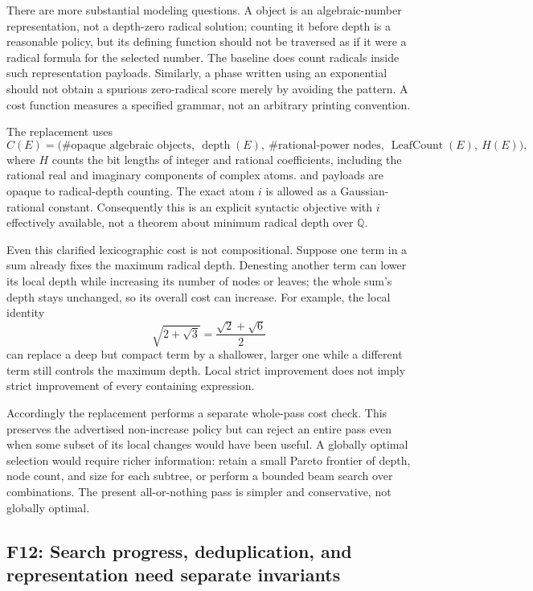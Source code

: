 \documentclass[11pt,letterpaper]{article}
\newcommand{\code}[1]{\texttt{\detokenize{#1}}}
\newcommand{\Q}{\mathbb{Q}}
\DeclareMathOperator{\depth}{depth}
\theoremstyle{definition}
\theoremstyle{remark}
\newcommand{\finding}[2]{\subsection{#1: #2}\label{f:#1}}
\begin{document}
There are more substantial modeling questions. A \code{Root} object is an algebraic-number representation, not a depth-zero radical solution; counting it before depth is a reasonable policy, but its defining function should not be traversed as if it were a radical formula for the selected number. The baseline does count radicals inside such representation payloads. Similarly, a phase written using an exponential should not obtain a spurious zero-radical score merely by avoiding the \code{Power[_,_Rational]} pattern. A cost function measures a specified grammar, not an arbitrary printing convention.

The replacement uses
\begin{equation}\label{eq:newcost}
 C(E)=\bigl(\#\text{opaque algebraic objects},\ \depth(E),\
 \#\text{rational-power nodes},\ \operatorname{LeafCount}(E),\ H(E)\bigr),
\end{equation}
where $H$ counts the bit lengths of integer and rational coefficients, including the rational real and imaginary components of complex atoms. \code{Root} and \code{AlgebraicNumber} payloads are opaque to radical-depth counting. The exact atom $i$ is allowed as a Gaussian-rational constant. Consequently this is an explicit syntactic objective with $i$ effectively available, not a theorem about minimum radical depth over $\Q$.

Even this clarified lexicographic cost is not compositional. Suppose one term in a sum already fixes the maximum radical depth. Denesting another term can lower its local depth while increasing its number of nodes or leaves; the whole sum's depth stays unchanged, so its overall cost can increase. For example, the local identity
\[
 \sqrt{2+\sqrt3}=\frac{\sqrt2+\sqrt6}{2}
\]
can replace a deep but compact term by a shallower, larger one while a different term still controls the maximum depth. Local strict improvement does not imply strict improvement of every containing expression.

Accordingly the replacement performs a separate whole-pass cost check. This preserves the advertised non-increase policy but can reject an entire pass even when some subset of its local changes would have been useful. A globally optimal selection would require richer information: retain a small Pareto frontier of depth, node count, and size for each subtree, or perform a bounded beam search over combinations. The present all-or-nothing pass is simpler and conservative, not globally optimal.

\finding{F12}{Search progress, deduplication, and representation need separate invariants}
\end{document}
